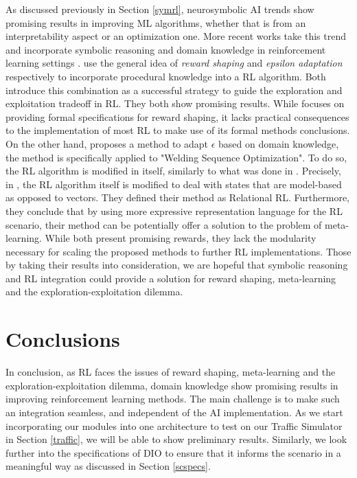 \documentclass[a4paper,11pt]{article}
\theoremstyle{definition}
\begin{document}
As discussed previously in Section \ref{symrl}, neurosymbolic AI trends show promising results in improving ML algorithms, whether that is from 
an interpretability aspect or an optimization one. More recent works take this trend and incorporate symbolic reasoning and 
domain knowledge in reinforcement learning settings \cite{Driessens2010,Romero2020,achiam2017,marek2010}. \cite{marek2010,Romero2020} use the general idea of \textit{reward shaping} and \textit{epsilon adaptation} respectively 
to incorporate procedural knowledge into a RL algorithm. Both introduce this combination as a successful strategy to guide the exploration and exploitation tradeoff in RL. They both show promising results. While 
\cite{marek2010} focuses on providing formal specifications for reward shaping, it lacks practical 
consequences to the implementation of most RL to make use of its formal methods conclusions. On the other hand, \cite{Romero2020} proposes a method to adapt $\epsilon$ based on domain knowledge, the method is specifically applied to "Welding Sequence Optimization".  
To do so, the RL algorithm is modified in itself, similarly to what was done in \cite{Driessens2010}. Precisely, in \cite{Driessens2010}, the RL algorithm itself is 
modified to deal with states that are model-based as opposed to vectors. They defined their method as Relational RL. 
Furthermore, they conclude that by using more expressive representation language for the RL scenario, their method can be potentially offer a solution to the problem of meta-learning. 
While \cite{Romero2020,Driessens2010} both present promising rewards, they lack the modularity necessary for scaling the proposed methods to further RL implementations. Those by taking their results into consideration, 
we are hopeful that symbolic reasoning and RL integration could provide a solution for reward shaping, meta-learning and the exploration-exploitation dilemma. 

\section{Conclusions}

In conclusion, as RL faces the issues of reward shaping, meta-learning and the exploration-exploitation dilemma, domain knowledge show promising results in 
improving reinforcement learning methods. The main challenge is to make such an integration seamless, and independent of the AI implementation. 
As we start incorporating our modules into one architecture to test on our Traffic Simulator in Section \ref{traffic}, we will be able to show preliminary 
results. Similarly, we look further into the specifications of DIO to ensure that it informs the scenario in a meaningful way as discussed in Section \ref{scspecs}. 

\newpage




\newpage

\appendix

\end{document}
